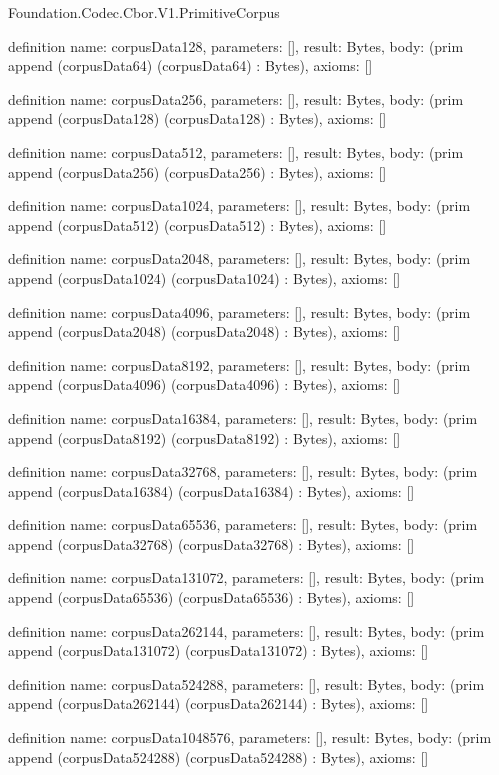 \begin{lexlean}{Foundation.Codec.Cbor.V1.PrimitiveCorpus}
\begin{semanticmodule}
definition{
  name: corpusData128,
  parameters: [],
  result: Bytes,
  body: (prim append (corpusData64) (corpusData64) : Bytes),
  axioms: []
}

definition{
  name: corpusData256,
  parameters: [],
  result: Bytes,
  body: (prim append (corpusData128) (corpusData128) : Bytes),
  axioms: []
}

definition{
  name: corpusData512,
  parameters: [],
  result: Bytes,
  body: (prim append (corpusData256) (corpusData256) : Bytes),
  axioms: []
}

definition{
  name: corpusData1024,
  parameters: [],
  result: Bytes,
  body: (prim append (corpusData512) (corpusData512) : Bytes),
  axioms: []
}

definition{
  name: corpusData2048,
  parameters: [],
  result: Bytes,
  body: (prim append (corpusData1024) (corpusData1024) : Bytes),
  axioms: []
}

definition{
  name: corpusData4096,
  parameters: [],
  result: Bytes,
  body: (prim append (corpusData2048) (corpusData2048) : Bytes),
  axioms: []
}

definition{
  name: corpusData8192,
  parameters: [],
  result: Bytes,
  body: (prim append (corpusData4096) (corpusData4096) : Bytes),
  axioms: []
}

definition{
  name: corpusData16384,
  parameters: [],
  result: Bytes,
  body: (prim append (corpusData8192) (corpusData8192) : Bytes),
  axioms: []
}

definition{
  name: corpusData32768,
  parameters: [],
  result: Bytes,
  body: (prim append (corpusData16384) (corpusData16384) : Bytes),
  axioms: []
}

definition{
  name: corpusData65536,
  parameters: [],
  result: Bytes,
  body: (prim append (corpusData32768) (corpusData32768) : Bytes),
  axioms: []
}

definition{
  name: corpusData131072,
  parameters: [],
  result: Bytes,
  body: (prim append (corpusData65536) (corpusData65536) : Bytes),
  axioms: []
}

definition{
  name: corpusData262144,
  parameters: [],
  result: Bytes,
  body: (prim append (corpusData131072) (corpusData131072) : Bytes),
  axioms: []
}

definition{
  name: corpusData524288,
  parameters: [],
  result: Bytes,
  body: (prim append (corpusData262144) (corpusData262144) : Bytes),
  axioms: []
}

definition{
  name: corpusData1048576,
  parameters: [],
  result: Bytes,
  body: (prim append (corpusData524288) (corpusData524288) : Bytes),
  axioms: []
}


\end{semanticmodule}
\end{lexlean}
